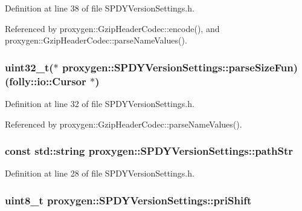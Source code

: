 Definition at line 38 of file S\+P\+D\+Y\+Version\+Settings.\+h.



Referenced by proxygen\+::\+Gzip\+Header\+Codec\+::encode(), and proxygen\+::\+Gzip\+Header\+Codec\+::parse\+Name\+Values().

\subsubsection[{parse\+Size\+Fun}]{\setlength{\rightskip}{0pt plus 5cm}uint32\+\_\+t($\ast$ proxygen\+::\+S\+P\+D\+Y\+Version\+Settings\+::parse\+Size\+Fun) (folly\+::io\+::\+Cursor $\ast$)}\label{structproxygen_1_1SPDYVersionSettings_ae1253223a1619105303ad1bf269a3c07}


Definition at line 32 of file S\+P\+D\+Y\+Version\+Settings.\+h.



Referenced by proxygen\+::\+Gzip\+Header\+Codec\+::parse\+Name\+Values().

\subsubsection[{path\+Str}]{\setlength{\rightskip}{0pt plus 5cm}const std\+::string proxygen\+::\+S\+P\+D\+Y\+Version\+Settings\+::path\+Str}\label{structproxygen_1_1SPDYVersionSettings_a7a15b3c5944b00423d03fe1f488fe862}


Definition at line 28 of file S\+P\+D\+Y\+Version\+Settings.\+h.

\subsubsection[{pri\+Shift}]{\setlength{\rightskip}{0pt plus 5cm}uint8\+\_\+t proxygen\+::\+S\+P\+D\+Y\+Version\+Settings\+::pri\+Shift}\label{structproxygen_1_1SPDYVersionSettings_a8ccf0b26cf42cdd4ea87d23af5e0ff3c}


